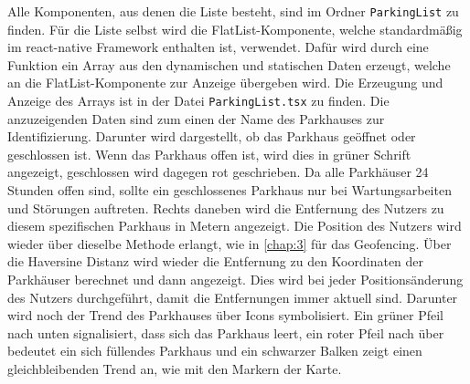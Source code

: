 Alle Komponenten, aus denen die Liste besteht, sind im Ordner \verb|ParkingList| zu finden. Für die Liste selbst wird die FlatList-Komponente, welche standardmäßig im react-native Framework enthalten ist, verwendet. Dafür wird durch eine Funktion ein Array aus den dynamischen und statischen Daten erzeugt, welche an die FlatList-Komponente zur Anzeige übergeben wird. Die Erzeugung und Anzeige des Arrays ist in der Datei \verb|ParkingList.tsx| zu finden. Die anzuzeigenden Daten sind zum einen der Name des Parkhauses zur Identifizierung. Darunter wird dargestellt, ob das Parkhaus geöffnet oder geschlossen ist. Wenn das Parkhaus offen ist, wird dies in grüner Schrift angezeigt, geschlossen wird dagegen rot geschrieben. Da alle Parkhäuser 24 Stunden offen sind, sollte ein geschlossenes Parkhaus nur bei Wartungsarbeiten und Störungen auftreten. Rechts daneben wird die Entfernung des Nutzers zu diesem spezifischen Parkhaus in Metern angezeigt. Die Position des Nutzers wird wieder über dieselbe Methode erlangt, wie in \autoref{chap:3} für das Geofencing. Über die Haversine Distanz wird wieder die Entfernung zu den Koordinaten der Parkhäuser berechnet und dann angezeigt. Dies wird bei jeder Positionsänderung des Nutzers durchgeführt, damit die Entfernungen immer aktuell sind. Darunter wird noch der Trend des Parkhauses über Icons symbolisiert. Ein grüner Pfeil nach unten signalisiert, dass sich das Parkhaus leert, ein roter Pfeil nach über bedeutet ein sich füllendes Parkhaus und ein schwarzer Balken zeigt einen gleichbleibenden Trend an, wie mit den Markern der Karte.

